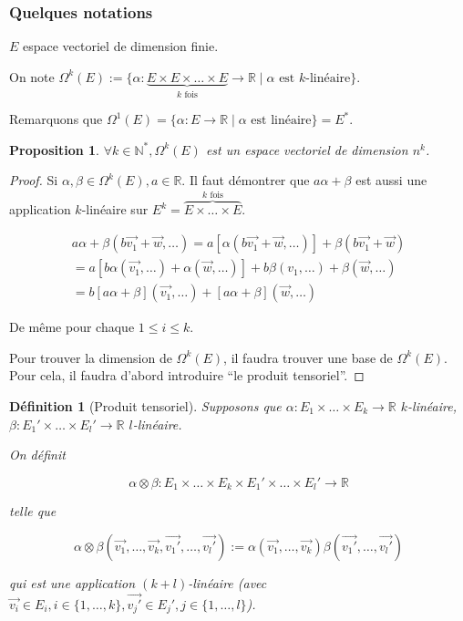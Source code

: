 \documentclass[french]{article}
\newtheorem{prop}{Proposition}[section]
\newtheorem{definition}{Définition}[section]
\begin{document}
\subsubsection{Quelques notations}

$E$ espace vectoriel de dimension finie.

On note $\Omega ^{k}(E) := \{ \alpha : \underbrace{E \times E \times \dots \times E}_{k \text{ fois} }  \to \mathbb{R} \mid \alpha \text{ est } k \text{-linéaire}  \} $.

Remarquons que $\Omega ^{1}(E) = \{ \alpha : E \to \mathbb{R} \mid \alpha \text{ est linéaire}  \} = E ^{*}$.

\begin{prop}
  $\forall k \in \mathbb{N} ^{*}, \Omega ^{k}(E) $ est un espace vectoriel de dimension $n ^{k}$.
\end{prop}

\begin{proof}
  Si $\alpha, \beta \in \Omega ^{k}(E), a \in \mathbb{R}$. Il faut démontrer que $a \alpha+ \beta$ est aussi une application $k$-linéaire sur $E ^k = \overbrace{E \times \dots \times E}^{k \text{ fois}}$.

  \begin{gather*}
    a \alpha + \beta (b \overrightarrow{ v_1 }+ \overrightarrow{ w }, \dots) = a[\alpha(b \overrightarrow{ v_1 }+ \overrightarrow{ w }, \dots)]+ \beta(b \overrightarrow{ v_1 }+\overrightarrow{ w })\\
    = a[b \alpha(\overrightarrow{ v_1 }, \dots)+ \alpha(\overrightarrow{ w }, \dots)] + b \beta(v_1, \dots) + \beta(\overrightarrow{ w }, \dots) \\
    = b[a \alpha+ \beta](\overrightarrow{ v_1 }, \dots )+ [a \alpha+ \beta](\overrightarrow{ w }, \dots)
  \end{gather*}

  De même pour chaque $1 \leq i \leq k$.

  Pour trouver la dimension de $\Omega ^{k}(E)$, il faudra trouver une base de $\Omega ^{k}(E)$. Pour cela, il faudra d'abord introduire ``le produit tensoriel''.
\end{proof}

\begin{definition}[Produit tensoriel]
  Supposons que $\alpha : E_1 \times \dots \times E_k \to \mathbb{R}$ $k$-linéaire, $\beta: E_1' \times \dots \times E_l' \to \mathbb{R}$ $l$-linéaire.

  On définit

  \[
  \alpha \otimes \beta : E_1 \times \dots \times E_k \times E_1' \times \dots \times E_l' \longrightarrow \mathbb{R}
  \]

  telle que

  \[
  \alpha \otimes \beta(\overrightarrow{ v_1 }, \dots, \overrightarrow{ v_k }, \overrightarrow{ v_1' }, \dots, \overrightarrow{ v_l'} ):=\alpha(\overrightarrow{ v_1 }, \dots, \overrightarrow{ v_k }) \beta(\overrightarrow{ v_1' }, \dots, \overrightarrow{ v_l'})
  \]

  qui est une application $(k+l)$-linéaire (avec $\overrightarrow{ v_i } \in E_i, i \in \{ 1, \dots, k \}, \overrightarrow{ v_j' } \in E_j', j \in \{ 1, \dots, l\}$).
\end{definition}
\end{document}
